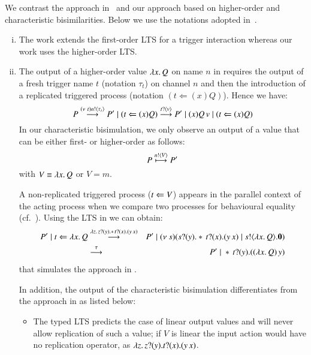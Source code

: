 
%
{} 
We contrast 
the approach in~\cite{JeffreyR05} and our approach based on 
higher-order and characteristic bisimilarities. 
Below we use the notations adopted in~\cite{JeffreyR05}.
 
\begin{enumerate}[i)]
	\item	The work \cite{JeffreyR05} extends the first-order
		LTS for a trigger interaction whereas 
		our work uses the higher-order LTS. 

	\item	The output of a higher-order value $\lambda x.\,Q$ on name
		$n$ in \cite{JeffreyR05}
		requires the output of
		a fresh trigger name $t$ (notation $\tau_t$)
		on channel $n$ 
		and then the introduction of a replicated triggered process
		(notation $(t \Leftarrow (x) Q)$). 
		Hence we have:
		\[
			P \stackrel{(\nu\ t) n ! \langle \tau_{t} \rangle}{\longrightarrow} P' \;|\; (t \Leftarrow (x) Q) \stackrel{t ? \langle v \rangle}{\longrightarrow} P' \;|\; (x) Q\,v \;|\; (t \Leftarrow (x) Q) 
		\]
	In our characteristic bisimulation, we only observe
	an output of a value that can be either first- or higher-order as follows:
		\[
			P \stackrel{n ! \langle V \rangle}{\longmapsto} P' 
		\]
		with $V \equiv \lambda x.\,Q$ or $V = m$.

		A non-replicated triggered process ($t \Leftarrow V$)
		appears in 
		the parallel context of the acting process when
		we compare two processes for behavioural equality
		(cf.~).
		Using the LTS in
		 we can obtain:
		\begin{eqnarray*}
			P' \;|\; t \Leftarrow \lambda x.\,Q
			&\stackrel{\lambda z.\,z ? (y) . \ast\,{} t ? (x) . (y\,x)}{\longrightarrow}&
			P' \;|\; (\nu\ s)(s ? (y) . \ast\,{} t ? (x) . 
(y\,x) \;|\; s ! \langle \lambda x.\,Q \rangle . \mathbf{0})\\
			&\stackrel{\tau}{\longrightarrow}&
			P' \;|\; \ast\,{}t ? (y) . ((\lambda x.\,Q)\,y)
		\end{eqnarray*}
		that simulates the approach in \cite{JeffreyR05}.

	In addition, the output of the characteristic bisimulation 
differentiates from
		the approach in \cite{JeffreyR05} as listed below:
		\begin{itemize}
			\item	The typed LTS predicts the case of linear
				output values and will never allow replication
				of such a value;
				if $V$ is linear the input action would have no replication
				operator, as
				$\lambda z.\,z ? (y) . t ? (x) . (y\,x)$.


\end{itemize}
\end{enumerate}
